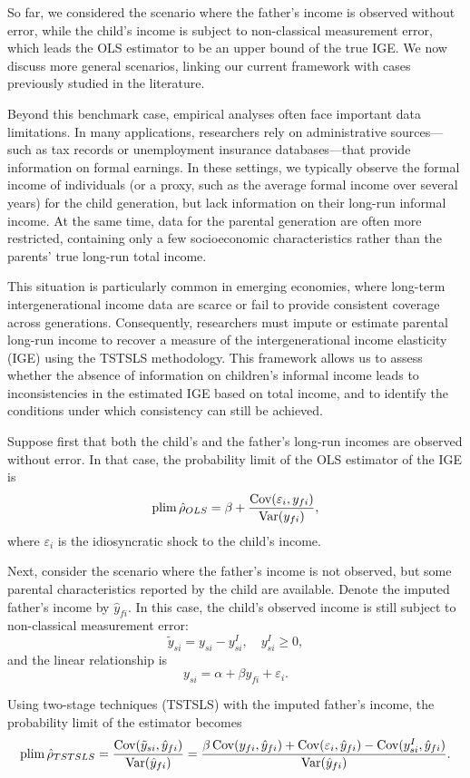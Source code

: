 So far, we considered the scenario where the father’s income is observed without error, while the child’s income is subject to non-classical measurement error, which leads the OLS estimator to be an upper bound of the true IGE. We now discuss more general scenarios, linking our current framework with cases previously studied in the literature.

Beyond this benchmark case, empirical analyses often face important data limitations. In many applications, researchers rely on administrative sources—such as tax records or unemployment insurance databases—that provide information on formal earnings. In these settings, we typically observe the formal income of individuals (or a proxy, such as the average formal income over several years) for the child generation, but lack information on their long-run informal income. At the same time, data for the parental generation are often more restricted, containing only a few socioeconomic characteristics rather than the parents’ true long-run total income. 

This situation is particularly common in emerging economies, where long-term intergenerational income data are scarce or fail to provide consistent coverage across generations. Consequently, researchers must impute or estimate parental long-run income to recover a measure of the intergenerational income elasticity (IGE) using the TSTSLS methodology. This framework allows us to assess whether the absence of information on children’s informal income leads to inconsistencies in the estimated IGE based on total income, and to identify the conditions under which consistency can still be achieved.


Suppose first that both the child’s and the father’s long-run incomes are observed without error. In that case, the probability limit of the OLS estimator of the IGE is
\[
\operatorname*{plim} \hat{\rho}_{OLS} = \beta + \frac{\operatorname{Cov}(\varepsilon_i, y_{fi})}{\operatorname{Var}(y_{fi})},
\]
where $\varepsilon_i$ is the idiosyncratic shock to the child’s income.

Next, consider the scenario where the father’s income is not observed, but some parental characteristics reported by the child are available. Denote the imputed father’s income by $\hat{y}_{fi}$. In this case, the child’s observed income is still subject to non-classical measurement error:
\[
\tilde y_{si} = y_{si} - y_{si}^I, \quad y_{si}^I \ge 0,
\]
and the linear relationship is
\[
y_{si} = \alpha + \beta y_{fi} + \varepsilon_i.
\]

Using two-stage techniques (TSTSLS) with the imputed father’s income, the probability limit of the estimator becomes
\[
\operatorname*{plim} \hat{\rho}_{TSTSLS} = \frac{\operatorname{Cov}(\tilde y_{si}, \hat{y}_{fi})}{\operatorname{Var}(\hat{y}_{fi})} = \frac{\beta \operatorname{Cov}(y_{fi}, \hat{y}_{fi}) + \operatorname{Cov}(\varepsilon_i, \hat{y}_{fi}) - \operatorname{Cov}(y_{si}^I, \hat{y}_{fi})}{\operatorname{Var}(\hat{y}_{fi})}.
\]


